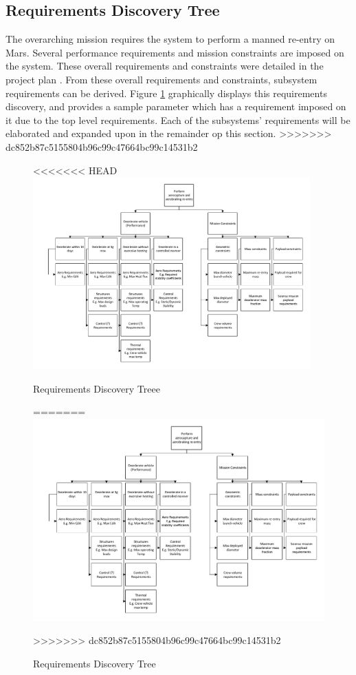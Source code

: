 \subsection{Requirements Discovery Tree}
The overarching mission requires the system to perform a manned re-entry on Mars. Several performance requirements and mission constraints are imposed on the system. These overall requirements and constraints were detailed in the project plan \cite{Balasooriyan2015}. From these overall requirements and constraints, subsystem requirements can be derived. Figure \ref{fig:RBS} graphically displays this requirements discovery, and provides a sample parameter which has a requirement imposed on it due to the top level requirements. Each of the subsystems' requirements will be elaborated and expanded upon in the remainder op this section. 
>>>>>>> dc852b87c5155804b96c99c47664bc99c14531b2

\vspace{-5mm}
\begin{figure}[H]
\centering
<<<<<<< HEAD
\includegraphics[width=0.95\textwidth]{Figure/RBS.pdf}
\caption{Requirements Discovery Treee} \label{fig:RBS}
=======
\hspace{-10mm}  
\includegraphics[width=1.00\textwidth]{Figure/RBS.pdf}
\vspace{-5mm}
\caption{Requirements Discovery Tree} 
\label{fig:RBS}
>>>>>>> dc852b87c5155804b96c99c47664bc99c14531b2
\end{figure}










